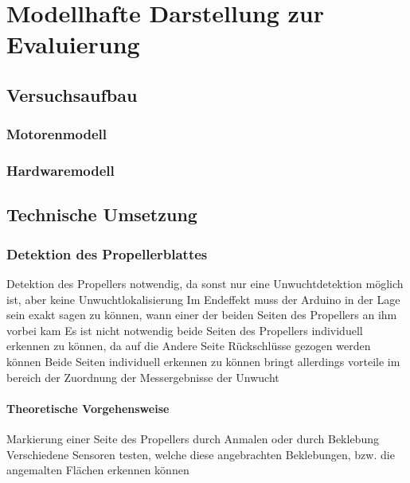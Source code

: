 
\chapter{Modellhafte Darstellung zur Evaluierung}

\section{Versuchsaufbau}

\subsection{Motorenmodell}

\subsection{Hardwaremodell}

\section{Technische Umsetzung}

\subsection{Detektion des Propellerblattes}
Detektion des Propellers notwendig, da sonst nur eine Unwuchtdetektion möglich ist, aber keine Unwuchtlokalisierung
Im Endeffekt muss der Arduino in der Lage sein exakt sagen zu können, wann einer der beiden Seiten des Propellers an ihm vorbei kam
Es ist nicht notwendig beide Seiten des Propellers individuell erkennen zu können, da auf die Andere Seite Rückschlüsse gezogen werden können
Beide Seiten individuell erkennen zu können bringt allerdings vorteile im bereich der Zuordnung der Messergebnisse der Unwucht

\subsubsection*{Theoretische Vorgehensweise}
Markierung einer Seite des Propellers durch Anmalen oder durch Beklebung
Verschiedene Sensoren testen, welche diese angebrachten Beklebungen, bzw. die angemalten Flächen erkennen können

